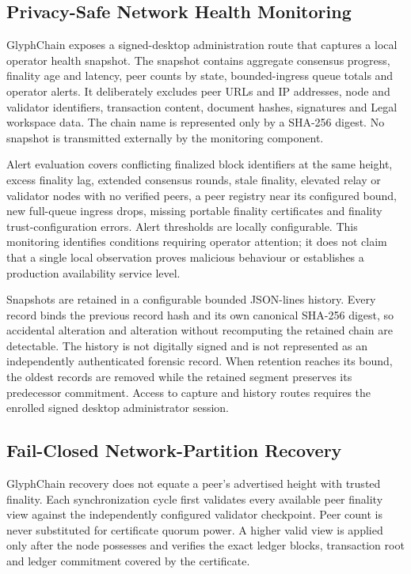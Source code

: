 \subsection{Privacy-Safe Network Health Monitoring}

GlyphChain exposes a signed-desktop administration route that captures a local
operator health snapshot. The snapshot contains aggregate consensus progress,
finality age and latency, peer counts by state, bounded-ingress queue totals and
operator alerts. It deliberately excludes peer URLs and IP addresses, node and
validator identifiers, transaction content, document hashes, signatures and
Legal workspace data. The chain name is represented only by a SHA-256 digest.
No snapshot is transmitted externally by the monitoring component.

Alert evaluation covers conflicting finalized block identifiers at the same
height, excess finality lag, extended consensus rounds, stale finality,
elevated relay or validator nodes with no verified peers, a peer registry near
its configured bound, new full-queue ingress drops, missing portable finality
certificates and finality trust-configuration errors. Alert thresholds are
locally configurable. This monitoring identifies conditions requiring operator
attention; it does not claim that a single local observation proves malicious
behaviour or establishes a production availability service level.

Snapshots are retained in a configurable bounded JSON-lines history. Every
record binds the previous record hash and its own canonical SHA-256 digest, so
accidental alteration and alteration without recomputing the retained chain are
detectable. The history is not digitally signed and is not represented as an
independently authenticated forensic record. When retention reaches its bound, the oldest
records are removed while the retained segment preserves its predecessor
commitment. Access to capture and history routes requires the enrolled signed
desktop administrator session.

\subsection{Fail-Closed Network-Partition Recovery}

GlyphChain recovery does not equate a peer's advertised height with trusted
finality.  Each synchronization cycle first validates every available peer
finality view against the independently configured validator checkpoint.  Peer
count is never substituted for certificate quorum power.  A higher valid view
is applied only after the node possesses and verifies the exact ledger blocks,
transaction root and ledger commitment covered by the certificate.

